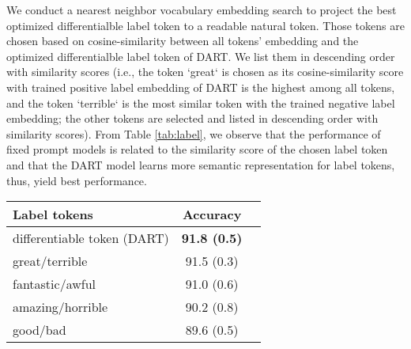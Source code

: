 \documentclass{article} \usepackage{iclr2022_conference,times}
\begin{document}
{We conduct a nearest neighbor vocabulary embedding search to project the best optimized differentialble label token to a readable natural token.
Those tokens are chosen based on cosine-similarity between all tokens' embedding and the optimized differentialble label token of DART. 
We list them in descending order with similarity scores (i.e., the token `great` is chosen as its cosine-similarity score with trained positive label embedding of DART is the highest among all tokens, and the token `terrible` is the most similar token with the trained negative label embedding; the other tokens are selected and listed in descending order with similarity scores). 
From Table \ref{tab:label}, we observe that the performance of fixed prompt models is related to the similarity score of the chosen label token and that the DART model learns more semantic representation for label tokens, thus, yield best performance.

\begin{table*}[htb]
\begin{center}
\centering
\begin{tabular}{l c c}
\toprule
 \textbf{Label tokens} & \textbf{Accuracy} \\
\midrule
 differentiable token (DART) & \textbf{91.8 (0.5)} \\
 great/terrible & 91.5 (0.3) \\
 fantastic/awful & 91.0 (0.6) \\
 amazing/horrible & 90.2 (0.8) \\
 good/bad & 89.6 (0.5) \\
\bottomrule
\end{tabular}
\end{center}
\caption{Few-shot performance on CR task using constrained label tokens with DART.
}
\vspace{-15pt}
    \label{tab:label}
\end{table*}

 }
 
 
 
 
\end{document}
